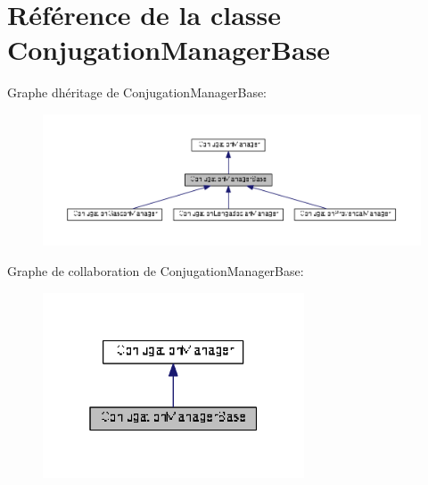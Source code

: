 \hypertarget{class_conjugation_manager_base}{}\section{Référence de la classe Conjugation\+Manager\+Base}
\label{class_conjugation_manager_base}


Graphe d\textquotesingle{}héritage de Conjugation\+Manager\+Base\+:
\nopagebreak
\begin{figure}[H]
\begin{center}
\leavevmode
\includegraphics[width=350pt]{class_conjugation_manager_base__inherit__graph}
\end{center}
\end{figure}


Graphe de collaboration de Conjugation\+Manager\+Base\+:
\nopagebreak
\begin{figure}[H]
\begin{center}
\leavevmode
\includegraphics[width=220pt]{class_conjugation_manager_base__coll__graph}
\end{center}
\end{figure}
